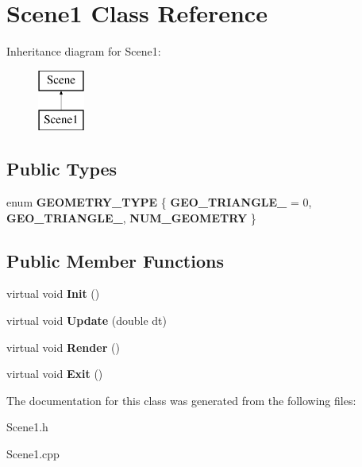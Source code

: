 \hypertarget{class_scene1}{\section{Scene1 Class Reference}
\label{class_scene1}
}
Inheritance diagram for Scene1\+:\begin{figure}[H]
\begin{center}
\leavevmode
\includegraphics[height=2.000000cm]{class_scene1}
\end{center}
\end{figure}
\subsection*{Public Types}
\begin{DoxyCompactItemize}
\item 
\hypertarget{class_scene1_aa9a6ee99c64ea967c6ddc707334c89a3}{enum {\bfseries G\+E\+O\+M\+E\+T\+R\+Y\+\_\+\+T\+Y\+P\+E} \{ {\bfseries G\+E\+O\+\_\+\+T\+R\+I\+A\+N\+G\+L\+E\+\_} = 0, 
{\bfseries G\+E\+O\+\_\+\+T\+R\+I\+A\+N\+G\+L\+E\+\_}, 
{\bfseries N\+U\+M\+\_\+\+G\+E\+O\+M\+E\+T\+R\+Y}
 \}}\label{class_scene1_aa9a6ee99c64ea967c6ddc707334c89a3}

\end{DoxyCompactItemize}
\subsection*{Public Member Functions}
\begin{DoxyCompactItemize}
\item 
\hypertarget{class_scene1_a34e29939733a7cfe7ac71cd3110e3eb1}{virtual void {\bfseries Init} ()}\label{class_scene1_a34e29939733a7cfe7ac71cd3110e3eb1}

\item 
\hypertarget{class_scene1_a569fefef6ee64f45979ea39b8f12b2b1}{virtual void {\bfseries Update} (double dt)}\label{class_scene1_a569fefef6ee64f45979ea39b8f12b2b1}

\item 
\hypertarget{class_scene1_aa99ede8a76f1d9dac4d491c5337d559e}{virtual void {\bfseries Render} ()}\label{class_scene1_aa99ede8a76f1d9dac4d491c5337d559e}

\item 
\hypertarget{class_scene1_a61e1db3a2a15af692807f28293e98eef}{virtual void {\bfseries Exit} ()}\label{class_scene1_a61e1db3a2a15af692807f28293e98eef}

\end{DoxyCompactItemize}


The documentation for this class was generated from the following files\+:\begin{DoxyCompactItemize}
\item 
Scene1.\+h\item 
Scene1.\+cpp\end{DoxyCompactItemize}
